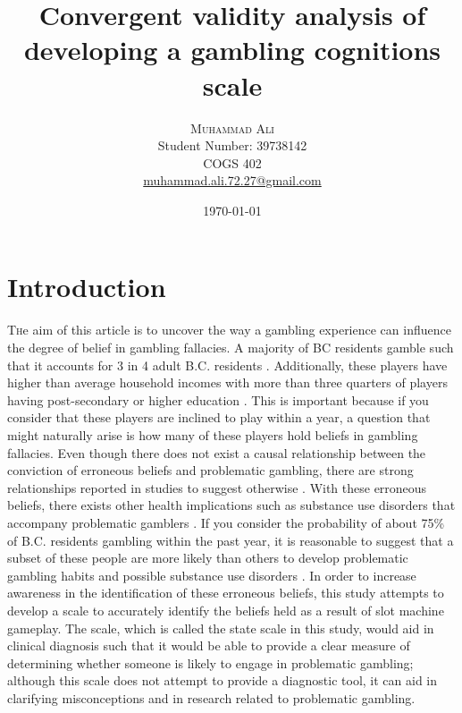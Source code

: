 \documentclass[twoside,twocolumn]{article}
\title{Convergent validity analysis of developing a gambling cognitions scale} %
\author{%
  \textsc{Muhammad Ali} \\[1ex] %
\normalsize Student Number: 39738142 \\
\normalsize COGS 402 \\ %
\normalsize \href{mailto:muhammad.ali.72.27@gmail.com.com}{muhammad.ali.72.27@gmail.com} %
}
\date{\today} %
\begin{document}
\maketitle


\section{Introduction}

\lettrine[nindent=0em,lines=3]{T}he aim of this article is to uncover the way a gambling experience can influence the degree of belief in gambling fallacies. A majority of BC residents gamble such that it accounts for 3 in 4 adult B.C. residents \cite{bclc}. Additionally, these players have higher than average household incomes with more than three quarters of players having post-secondary or higher education \cite{bclc}. This is important because if you consider that these players are inclined to play within a year, a question that might naturally arise is how many of these players hold beliefs in gambling fallacies. Even though there does not exist a causal relationship between the conviction of erroneous beliefs and problematic gambling, there are strong relationships reported in studies to suggest otherwise \cite{Ladouceur:2004, raylu:2004, darke:1997}. With these erroneous beliefs, there exists other health implications such as substance use disorders that accompany problematic gamblers \cite{rush:2008}. If you consider the probability of about 75\% of B.C. residents gambling within the past year, it is reasonable to suggest that a subset of these people are more likely than others to develop problematic gambling habits and possible substance use disorders \cite{bclc}. In order to increase awareness in the identification of these erroneous beliefs, this study attempts to develop a scale to accurately identify the beliefs held as a result of slot machine gameplay. The scale, which is called the state scale in this study, would aid in clinical diagnosis such that it would be able to provide a clear measure of determining whether someone is likely to engage in problematic gambling; although this scale does not attempt to provide a diagnostic tool, it can aid in clarifying misconceptions and in research related to problematic gambling.
\end{document}
